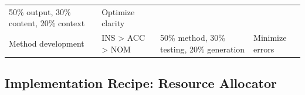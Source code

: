 \documentclass[
  11pt,
  letterpaper,
]{article}
\begin{document}
\begin{longtable}[]{@{}llll@{}}
\begin{minipage}[t]{0.27\columnwidth}
50\% output, 30\% content, 20\% context\strut
\end{minipage} & \begin{minipage}[t]{0.22\columnwidth}\raggedright
Optimize clarity\strut
\end{minipage}\tabularnewline
\begin{minipage}[t]{0.14\columnwidth}\raggedright
Method development\strut
\end{minipage} & \begin{minipage}[t]{0.26\columnwidth}\raggedright
INS \textgreater{} ACC \textgreater{} NOM\strut
\end{minipage} & \begin{minipage}[t]{0.27\columnwidth}\raggedright
50\% method, 30\% testing, 20\% generation\strut
\end{minipage} & \begin{minipage}[t]{0.22\columnwidth}\raggedright
Minimize errors\strut
\end{minipage}\tabularnewline
\bottomrule
\end{longtable}

\hypertarget{implementation-recipe-resource-allocator}{%
\subsection{Implementation Recipe: Resource
Allocator}\label{implementation-recipe-resource-allocator}}
\end{document}
